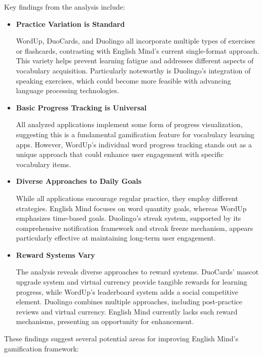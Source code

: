 Key findings from the analysis include:

\begin{itemize}
    \item \textbf{Practice Variation is Standard}
    
    WordUp, DuoCards, and Duolingo all incorporate multiple types of exercises or flashcards, contrasting with English Mind's current single-format approach. This variety helps prevent learning fatigue and addresses different aspects of vocabulary acquisition. Particularly noteworthy is Duolingo's integration of speaking exercises, which could become more feasible with advancing language processing technologies.

    \item \textbf{Basic Progress Tracking is Universal}
    
    All analyzed applications implement some form of progress visualization, suggesting this is a fundamental gamification feature for vocabulary learning apps. However, WordUp's individual word progress tracking stands out as a unique approach that could enhance user engagement with specific vocabulary items.

    \item \textbf{Diverse Approaches to Daily Goals}
    
    While all applications encourage regular practice, they employ different strategies. English Mind focuses on word quantity goals, whereas WordUp emphasizes time-based goals. Duolingo's streak system, supported by its comprehensive notification framework and streak freeze mechanism, appears particularly effective at maintaining long-term user engagement.

    \item \textbf{Reward Systems Vary}
    
    The analysis reveals diverse approaches to reward systems. DuoCards' mascot upgrade system and virtual currency provide tangible rewards for learning progress, while WordUp's leaderboard system adds a social competitive element. Duolingo combines multiple approaches, including post-practice reviews and virtual currency. English Mind currently lacks such reward mechanisms, presenting an opportunity for enhancement.

\end{itemize}

These findings suggest several potential areas for improving English Mind's gamification framework:

